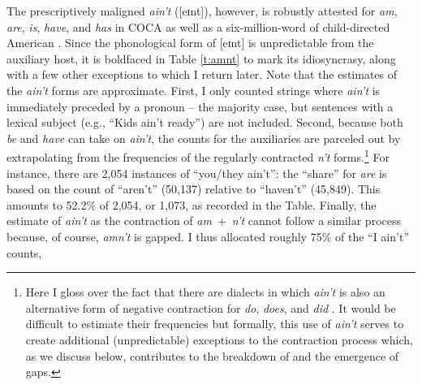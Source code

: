 \documentclass[output=paper,
modfonts
]{LSP/langsci}
\begin{document}
The prescriptively maligned \textit{ain't} ([eɪnt]), however, 
is robustly attested for \textit{am}, \textit{are}, \textit{is}, \textit{have},
and \textit{has} in COCA as well as a six-million-word  of
child-directed American  \citep{CHILDES}.
Since the phonological form of
[eɪnt] is unpredictable from the auxiliary host, it is boldfaced in
Table \ref{t:amnt} to mark its idiosyncrasy,  along with a few other
exceptions  to which I return later.  Note that
 the  estimates of the \textit{ain't} forms are 
approximate.  First, I only counted strings where \textit{ain't} is
immediately preceded by a pronoun -- the majority case, but
sentences with a lexical subject (e.g., ``Kids ain't ready'') are not
included. Second, because both \textit{be} and \textit{have} can take on \textit{ain't}, the counts 
for the auxiliaries are parceled out by extrapolating from the
frequencies of the regularly contracted \textit{
  n't} forms.\footnote{Here I gloss over the fact that there are 
  dialects in which \textit{ain't} is also an alternative form of
  negative contraction for \textit{do}, \textit{does}, and \textit{did}
  \citep[e.g.,][]{Labov1968, Weldon1994}. It would be difficult to
  estimate their frequencies but formally, this use of \textit{ain't}
 serves to create additional (unpredictable) exceptions to the contraction
  process which, as we discuss below, contributes to the breakdown of
   and  the emergence of  gaps. } For
instance, there are 2,054 instances of ``you/they 
ain't'': the ``share'' for \textit{are} is based on the count of ``aren't''
(50,137) relative to  ``haven't'' (45,849). This amounts to 52.2\% of 2,054,
or 1,073, as recorded in the Table. Finally, the estimate of \textit{ain't} as the contraction of \textit{am}~+~\textit{n't} cannot follow a
similar process because, of course, \textit{amn't} is 
gapped. I thus allocated roughly 75\% of the ``I ain't'' counts,
\end{document}

